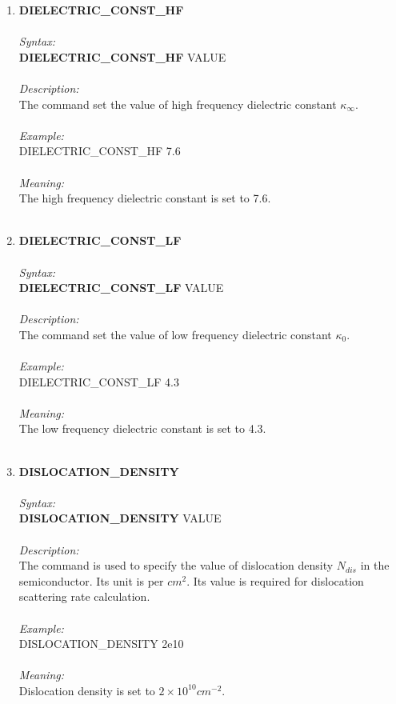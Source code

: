 \documentclass[12pt]{article}
\begin{document}
\begin{enumerate}
    \item \textbf{DIELECTRIC\_CONST\_HF} \\ \\
    \textit{Syntax:} \\
    \textbf{DIELECTRIC\_CONST\_HF} VALUE \\ \\
    \textit{Description:} \\
    The command set the value of high frequency dielectric constant $\kappa_\infty$. \\ \\
    \textit{Example:} \\
    DIELECTRIC\_CONST\_HF 7.6 \\ \\
    \textit{Meaning:} \\    
    The high frequency dielectric constant is set to 7.6. \\ \\

    \item \textbf{DIELECTRIC\_CONST\_LF} \\ \\
    \textit{Syntax:} \\
    \textbf{DIELECTRIC\_CONST\_LF} VALUE \\ \\
    \textit{Description:} \\
    The command set the value of low frequency dielectric constant $\kappa_0$. \\ \\
    \textit{Example:} \\
    DIELECTRIC\_CONST\_LF 4.3 \\ \\
    \textit{Meaning:} \\    
    The low frequency dielectric constant is set to 4.3.\\ \\

    \item \textbf{DISLOCATION\_DENSITY} \\ \\
    \textit{Syntax:} \\
    \textbf{DISLOCATION\_DENSITY} VALUE \\ \\
    \textit{Description:} \\
    The command is used to specify the value of dislocation density $N_{dis}$ in the semiconductor. Its unit is per $cm^2$. Its value is required for dislocation scattering rate calculation.\\ \\
    \textit{Example:} \\
    DISLOCATION\_DENSITY 2e10 \\ \\ 
    \textit{Meaning:} \\    
    Dislocation density is set to $2 \times 10^{10} cm^{-2}$. \\ \\


\end{enumerate}
\end{document}
